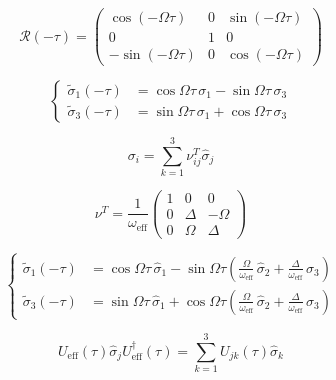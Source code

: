 \documentclass{article}
\begin{document}
\begin{equation}
  \mathcal{R}(-\tau) = 
  \begin{pmatrix}
    \cos(-\Omega\tau)  &0 & \sin(-\Omega\tau) \\
    0                  &1 & 0                 \\
    -\sin(-\Omega\tau) &0 & \cos(-\Omega\tau) 
  \end{pmatrix}
\end{equation}

\begin{equation}
  \left\{
    \begin{aligned}
      \widetilde{\sigma}_1(-\tau) &= \cos\Omega\tau \, \sigma_1 - \sin\Omega\tau
      \,
      \sigma_3 \\
      \widetilde{\sigma}_3(-\tau) &= \sin\Omega\tau \, \sigma_1 + \cos\Omega\tau
      \, \sigma_3
    \end{aligned}
  \right.
\end{equation}

\begin{equation}
  \sigma_i = \sum_{k=1}^3 \nu^T_{ij} \hat{\sigma}_j
\end{equation}

\begin{equation}
  \nu^{T} = \frac{1}{\omega_{\mathrm{eff}}}
  \begin{pmatrix}
    1 &0 &0 \\
    0 &\Delta &-\Omega\\
    0 &\Omega &\Delta
  \end{pmatrix}
\end{equation}

\begin{equation}
  \left\{
    \begin{aligned}
      \widetilde{\sigma}_1(-\tau) &= \cos\Omega\tau \, \hat{\sigma}_1 -
      \sin\Omega\tau \left(\frac{\Omega}{\omega_{\mathrm{eff}}} \, \hat{\sigma}_2 +
        \frac{\Delta}{\omega_{\mathrm{eff}}} \, \hat{\sigma}_3 \right) \\
      \widetilde{\sigma}_3(-\tau) &= \sin\Omega\tau \, \hat{\sigma}_1 +
      \cos\Omega\tau \left( \frac{\Omega}{\omega_{\mathrm{eff}}} \,
        \hat{\sigma}_2 + \frac{\Delta}{\omega_{\mathrm{eff}}} \, \hat{\sigma}_3
      \right) 
    \end{aligned}
  \right.
\end{equation}

\begin{equation}
  U_{\mathrm{eff}}(\tau) \hat{\sigma}_j U_{\mathrm{eff}}^\dagger (\tau) =
  \sum_{k=1}^3 U_{jk}(\tau)\hat{\sigma}_k
\end{equation}
\end{document}
